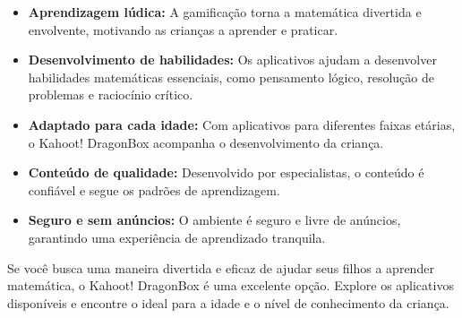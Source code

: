 \begin{itemize}
\begin{itemize}
    \end{itemize}

\begin{itemize}
    \item \textbf{Aprendizagem lúdica:} A gamificação torna a matemática divertida e envolvente, motivando as crianças a aprender e praticar.
    \item \textbf{Desenvolvimento de habilidades:} Os aplicativos ajudam a desenvolver habilidades matemáticas essenciais, como pensamento lógico, resolução de problemas e raciocínio crítico.
    \item \textbf{Adaptado para cada idade:} Com aplicativos para diferentes faixas etárias, o Kahoot! DragonBox acompanha o desenvolvimento da criança.
    \item \textbf{Conteúdo de qualidade:} Desenvolvido por especialistas, o conteúdo é confiável e segue os padrões de aprendizagem.
    \item \textbf{Seguro e sem anúncios:} O ambiente é seguro e livre de anúncios, garantindo uma experiência de aprendizado tranquila.
\end{itemize}

Se você busca uma maneira divertida e eficaz de ajudar seus filhos a aprender matemática, o Kahoot! DragonBox é uma excelente opção. Explore os aplicativos disponíveis e encontre o ideal para a idade e o nível de conhecimento da criança.


\end{itemize}
